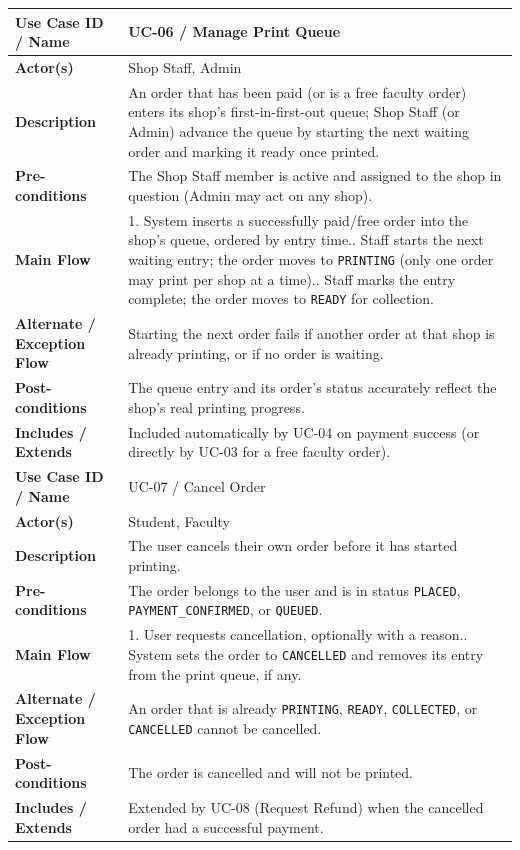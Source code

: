 \documentclass[12pt,a4paper]{report}
\begin{document}
\begin{center}
\begin{longtable}{|p{3.3cm}|p{10.7cm}|}
\textbf{Use Case ID / Name} & UC-06 / Manage Print Queue \\ \hline
\textbf{Actor(s)} & Shop Staff, Admin \\ \hline
\textbf{Description} & An order that has been paid (or is a free faculty order) enters its shop's first-in-first-out queue; Shop Staff (or Admin) advance the queue by starting the next waiting order and marking it ready once printed. \\ \hline
\textbf{Pre-conditions} & The Shop Staff member is active and assigned to the shop in question (Admin may act on any shop). \\ \hline
\textbf{Main Flow} & 1. System inserts a successfully paid/free order into the shop's queue, ordered by entry time.\newline 2. Staff starts the next waiting entry; the order moves to \texttt{PRINTING} (only one order may print per shop at a time).\newline 3. Staff marks the entry complete; the order moves to \texttt{READY} for collection. \\ \hline
\textbf{Alternate / Exception Flow} & Starting the next order fails if another order at that shop is already printing, or if no order is waiting. \\ \hline
\textbf{Post-conditions} & The queue entry and its order's status accurately reflect the shop's real printing progress. \\ \hline
\textbf{Includes / Extends} & Included automatically by UC-04 on payment success (or directly by UC-03 for a free faculty order). \\ \hline

\textbf{Use Case ID / Name} & UC-07 / Cancel Order \\ \hline
\textbf{Actor(s)} & Student, Faculty \\ \hline
\textbf{Description} & The user cancels their own order before it has started printing. \\ \hline
\textbf{Pre-conditions} & The order belongs to the user and is in status \texttt{PLACED}, \texttt{PAYMENT\_CONFIRMED}, or \texttt{QUEUED}. \\ \hline
\textbf{Main Flow} & 1. User requests cancellation, optionally with a reason.\newline 2. System sets the order to \texttt{CANCELLED} and removes its entry from the print queue, if any. \\ \hline
\textbf{Alternate / Exception Flow} & An order that is already \texttt{PRINTING}, \texttt{READY}, \texttt{COLLECTED}, or \texttt{CANCELLED} cannot be cancelled. \\ \hline
\textbf{Post-conditions} & The order is cancelled and will not be printed. \\ \hline
\textbf{Includes / Extends} & Extended by UC-08 (Request Refund) when the cancelled order had a successful payment. \\ \hline


\end{longtable}
\end{center}
\end{document}
